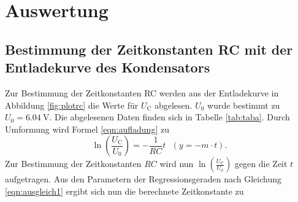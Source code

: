 \section{Auswertung}
\label{sec:Auswertung}
\subsection{Bestimmung der Zeitkonstanten RC mit der Entladekurve des Kondensators}
\label{sec:RC}
Zur Bestimmung der Zeitkonstanten RC werden aus der Entladekurve in Abbildung \ref{fig:plotrc} die Werte für $U_\text{C}$ abgelesen.
$U_\text{0}$ wurde bestimmt zu $U_\text{0}=\SI{6.04}{\volt}$.
Die abgelesenen Daten finden sich in Tabelle \ref{tab:taba}.
Durch Umformung wird Formel \eqref{eqn:aufladung} zu
\begin{equation}
	\label{eqn:ausgleich1}
	\ln\left(\frac{U_\text{C}}{U_\text{0}}\right)=-\frac{1}{RC}t \,\,\,\, (y = -m \cdot t).
\end{equation}
Zur Bestimmung der Zeitkonstanten $RC$ wird nun $\ln\left(\frac{U_\text{C}}{U_\text{0}}\right)$ gegen die Zeit $t$ aufgetragen.
Aus den Parametern der Regressionsgeraden nach Gleichung \eqref{eqn:ausgleich1} ergibt sich nun die berechnete Zeitkonstante zu


